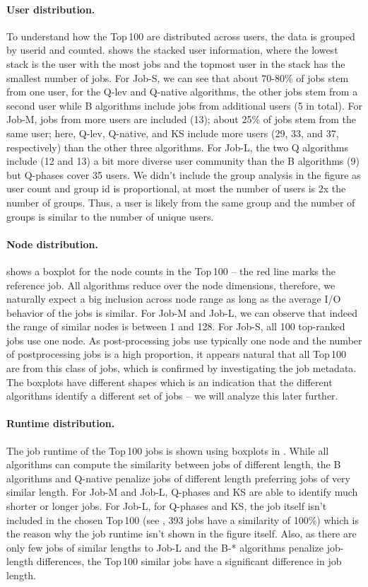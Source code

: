 \documentclass{jhps}
\begin{document}
\paragraph{User distribution.}
To understand how the Top\,100 are distributed across users, the data is grouped by userid and counted.
 shows the stacked user information, where the lowest stack is the user with the most jobs and the topmost user in the stack has the smallest number of jobs.
For Job-S, we can see that about 70-80\% of jobs stem from one user, for the Q-lev and Q-native algorithms, the other jobs stem from a second user while B algorithms include jobs from additional users (5 in total).
For Job-M, jobs from more users are included (13); about 25\% of jobs stem from the same user; here, Q-lev, Q-native, and KS include more users (29, 33, and 37, respectively) than the other three algorithms.
For Job-L, the two Q algorithms include (12 and 13) a bit more diverse user community than the B algorithms (9) but Q-phases cover 35 users.
We didn't include the group analysis in the figure as user count and group id is proportional, at most the number of users is 2x the number of groups.
Thus, a user is likely from the same group and the number of groups is similar to the number of unique users.

\paragraph{Node distribution.}
 shows a boxplot for the node counts in the Top\,100 -- the red line marks the reference job.
All algorithms reduce over the node dimensions, therefore, we naturally expect a big inclusion across node range as long as the average I/O behavior of the jobs is similar.
For Job-M and Job-L, we can observe that indeed the range of similar nodes is between 1 and 128.
For Job-S, all 100 top-ranked jobs use one node.
As post-processing jobs use typically one node and the number of postprocessing jobs is a high proportion, it appears natural that all Top\,100 are from this class of jobs, which is confirmed by investigating the job metadata.
The boxplots have different shapes which is an indication that the different algorithms identify a different set of jobs -- we will analyze this later further.

\paragraph{Runtime distribution.}
The job runtime of the Top\,100 jobs is shown using boxplots in .
While all algorithms can compute the similarity between jobs of different length, the B algorithms and Q-native penalize jobs of different length preferring jobs of very similar length.
For Job-M and Job-L, Q-phases and KS are able to identify much shorter or longer jobs.
For Job-L, for Q-phases and KS, the job itself isn't included in the chosen Top\,100 (see , 393 jobs have a similarity of 100\%) which is the reason why the job runtime isn't shown in the figure itself.
Also, as there are only few jobs of similar lengths to Job-L and the B-* algorithms penalize job-length differences, the Top\,100 similar jobs have a significant difference in job length.
\end{document}
